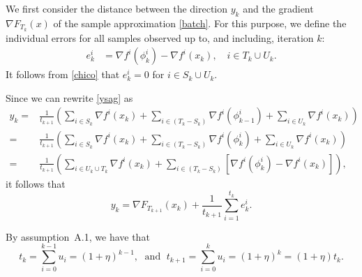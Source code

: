 \documentclass[11pt]{article}
\begin{document}
We first consider the distance between the direction $y_k$ and the gradient $\nabla F_{T_k}(x)$ of the sample approximation \eqref{batch}. For this purpose, we define the individual errors for all samples observed up to, and including,  iteration $k$:  
\begin{align}
 e_k^i &= \nabla f^i(\phi_{k}^i)-\nabla f^i(x_k), \quad i\in T_k \cup U_k.
\end{align}
It follows from 
\eqref{chico} that $e_k^i = 0$ for $ i \in S_k \cup U_k$.

Since we can rewrite \eqref{ysag} as
 \begin{align}  \label{gk_sag2}
       y_k = &  \frac{1}{t_{k+1}} \left(\sum_{i \in S_k} \nabla f^i(x_{k}) +\sum_{i\in (T_k-S_k)} \nabla f^i (\phi^i_{k-1}) + \sum_{i \in U_k}  \nabla f^i(x_k)\right) \\
       = & \frac{1}{t_{k+1}} \left(\sum_{i \in S_k} \nabla f^i(x_{k}) +\sum_{i\in (T_k-S_k)} \nabla f^i (\phi^i_{k}) + \sum_{i \in U_k}  \nabla f^i(x_k)\right) \\
       = & \frac{1}{t_{k+1}} \left(\sum_{i \in U_k \cup T_k} \nabla f^i(x_{k}) +\sum_{i\in (T_k-S_k)} [ \nabla f^i (\phi^i_{k})  -
        \nabla f^i(x_{k})] \right) ,
 \end{align}
it follows that
\begin{equation}\label{eq:y}
 y_k = \nabla F_{T_{k+1}}(x_k) + \frac{1}{t_{k+1}}\sum_{i=1}^{t_k} e_k^i .
\end{equation}

By assumption~A.1, we have that 
\begin{equation}
	t_{k} = \sum_{i=0}^{k-1} u_i = (1+\eta)^{k-1}, \; \mbox{ and } \; t_{k+1} = \sum_{i=0}^{k} u_i = (1+\eta)^{k} = (1+\eta) t_k.
\end{equation}
\end{document}
